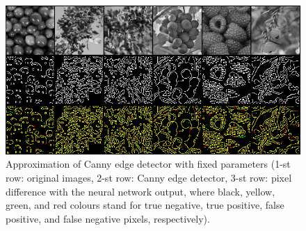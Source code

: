 \begin{table}[h]
\caption{Metrics for Canny edge detector approximation}
\label{table:MetricsCanny}
\end{table}

\begin{figure}[h]
\centering
\includegraphics[width=0.85\linewidth]{fig/canny fixed2.png}
\caption{Approximation of Canny edge detector with fixed parameters (1-st row: original images, 2-st row: Canny edge detector, 3-st row: pixel difference with the neural network output, where black, yellow, green, and red colours stand for true negative, true positive, false positive, and false negative pixels, respectively).}
\label{figure:Canny}
\end{figure}


